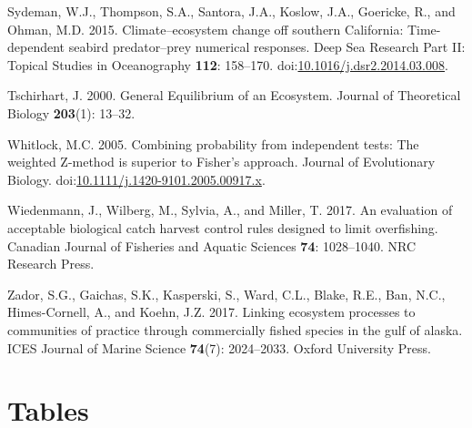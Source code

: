 \documentclass[]{article}
\begin{document}
\hypertarget{ref-sydeman_climateecosystem_2015}{}
Sydeman, W.J., Thompson, S.A., Santora, J.A., Koslow, J.A., Goericke,
R., and Ohman, M.D. 2015. Climate--ecosystem change off southern
California: Time-dependent seabird predator--prey numerical responses.
Deep Sea Research Part II: Topical Studies in Oceanography \textbf{112}:
158--170.
doi:\href{https://doi.org/10.1016/j.dsr2.2014.03.008}{10.1016/j.dsr2.2014.03.008}.

\hypertarget{ref-Tschirhart2000GeneralEcosystem}{}
Tschirhart, J. 2000. General Equilibrium of an Ecosystem. Journal of
Theoretical Biology \textbf{203}(1): 13--32.

\hypertarget{ref-Whitlock2005CombiningApproach}{}
Whitlock, M.C. 2005. Combining probability from independent tests: The
weighted Z-method is superior to Fisher's approach. Journal of
Evolutionary Biology.
doi:\href{https://doi.org/10.1111/j.1420-9101.2005.00917.x}{10.1111/j.1420-9101.2005.00917.x}.

\hypertarget{ref-Wiedenmann2017}{}
Wiedenmann, J., Wilberg, M., Sylvia, A., and Miller, T. 2017. An
evaluation of acceptable biological catch harvest control rules designed
to limit overfishing. Canadian Journal of Fisheries and Aquatic Sciences
\textbf{74}: 1028--1040. NRC Research Press.

\hypertarget{ref-zador2017linking}{}
Zador, S.G., Gaichas, S.K., Kasperski, S., Ward, C.L., Blake, R.E., Ban,
N.C., Himes-Cornell, A., and Koehn, J.Z. 2017. Linking ecosystem
processes to communities of practice through commercially fished species
in the gulf of alaska. ICES Journal of Marine Science \textbf{74}(7):
2024--2033. Oxford University Press.

\newpage

\section{Tables}\label{tables}
\end{document}
